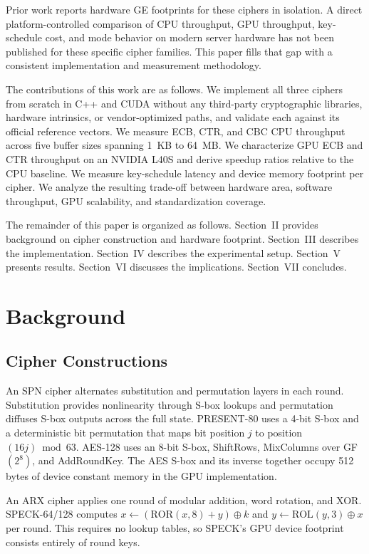 \documentclass[conference]{IEEEtran}
\begin{document}
Prior work reports hardware GE footprints for these ciphers in isolation. A direct platform-controlled
comparison of CPU throughput, GPU throughput, key-schedule cost, and mode behavior on modern server
hardware has not been published for these specific cipher families. This paper fills that gap with a
consistent implementation and measurement methodology.

The contributions of this work are as follows. We implement all three ciphers from scratch in C++ and
CUDA without any third-party cryptographic libraries, hardware intrinsics, or vendor-optimized paths,
and validate each against its official reference vectors. We measure ECB, CTR, and CBC CPU throughput
across five buffer sizes spanning 1~KB to 64~MB. We characterize GPU ECB and CTR throughput on an
NVIDIA L40S and derive speedup ratios relative to the CPU baseline. We measure key-schedule latency
and device memory footprint per cipher. We analyze the resulting trade-off between hardware area,
software throughput, GPU scalability, and standardization coverage.

The remainder of this paper is organized as follows. Section~II provides background on cipher
construction and hardware footprint. Section~III describes the implementation. Section~IV describes
the experimental setup. Section~V presents results. Section~VI discusses the implications.
Section~VII concludes.

\section{Background}

\subsection{Cipher Constructions}

An SPN cipher alternates substitution and permutation layers in each round. Substitution provides
nonlinearity through S-box lookups and permutation diffuses S-box outputs across the full state.
PRESENT-80 uses a 4-bit S-box and a deterministic bit permutation that maps bit position $j$ to
position $(16j) \bmod 63$. AES-128 uses an 8-bit S-box, ShiftRows, MixColumns over
GF$(2^8)$, and AddRoundKey. The AES S-box and its inverse together occupy 512 bytes of device
constant memory in the GPU implementation.

An ARX cipher applies one round of modular addition, word rotation, and XOR. SPECK-64/128 computes
$x \leftarrow (\mathrm{ROR}(x, 8) + y) \oplus k$ and $y \leftarrow \mathrm{ROL}(y, 3) \oplus x$ per
round. This requires no lookup tables, so SPECK's GPU device footprint consists entirely of round keys.
\end{document}

